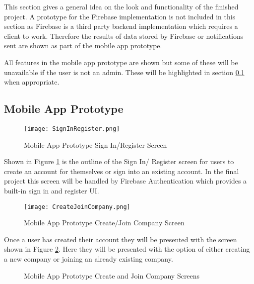 This section gives a general idea on the look and functionality of the finished project. A prototype for the Firebase implementation is not included in this section as Firebase is a third party backend implementation which requires a client to work. Therefore the results of data stored by Firebase or notifications sent are shown as part of the mobile app prototype. 

All features in the mobile app prototype are shown but some of these will be unavailable if the user is not an admin. These will be highlighted in section \ref{section:mobileappprototype} when appropriate.

\subsection{Mobile App Prototype}
\label{section:mobileappprototype}

\begin{figure}[ht]
  \centering
      \texttt{[image: SignInRegister.png]}
  \caption[Mobile App Prototype Sign In/Register Screen]{Mobile App Prototype Sign In/Register Screen}
  \label{fig:signInRegister}
\end{figure}

Shown in Figure \ref{fig:signInRegister} is the outline of the Sign In/ Register screen for users to create an account for themselves or sign into an existing account. In the final project this screen will be handled by Firebase Authentication which provides a built-in sign in and register UI.

\clearpage
\begin{figure}[ht]
  \centering
      \texttt{[image: CreateJoinCompany.png]}
  \caption[Mobile App Prototype Create/Join Company Screen]{Mobile App Prototype Create/Join Company Screen}
  \label{fig:CreateJoinCompany}
\end{figure}

Once a user has created their account they will be presented with the screen shown in Figure \ref{fig:CreateJoinCompany}. Here they will be presented with the option of either creating a new company or joining an already existing company.

\clearpage
\begin{figure}
\centering     %
{}
\caption{Mobile App Prototype Create and Join Company Screens}
\label{fig:CreateAndJoinCompanyScreens}
\end{figure}

